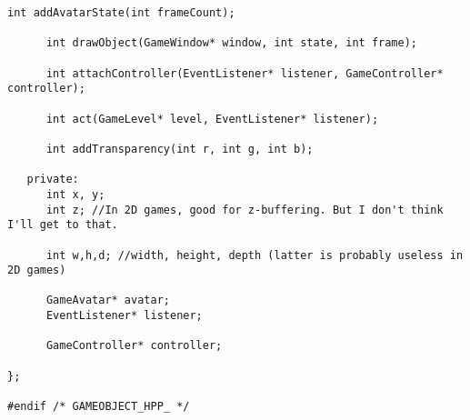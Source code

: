 \documentclass[12pt]{article}
\begin{document}
\begin{lstlisting}[breaklines]
      int addAvatarState(int frameCount);
      
      int drawObject(GameWindow* window, int state, int frame);

      int attachController(EventListener* listener, GameController* controller);
      
      int act(GameLevel* level, EventListener* listener);
      
      int addTransparency(int r, int g, int b);

   private:
      int x, y;
      int z; //In 2D games, good for z-buffering. But I don't think I'll get to that.

      int w,h,d; //width, height, depth (latter is probably useless in 2D games)

      GameAvatar* avatar;
      EventListener* listener;
      
      GameController* controller;

};

#endif /* GAMEOBJECT_HPP_ */
\end{lstlisting}
\end{document}
